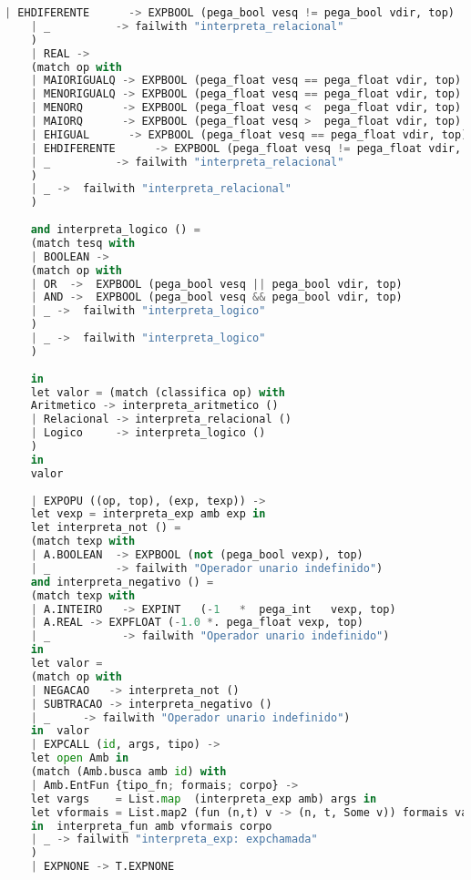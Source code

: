 \documentclass[hidelinks,12pt]{article}
\begin{document}
\begin{appendices}
\begin{lstlisting}[caption=interprete.mll, language=python]
	| EHDIFERENTE      -> EXPBOOL (pega_bool vesq != pega_bool vdir, top)
	| _          -> failwith "interpreta_relacional"
	)
	| REAL ->
	(match op with
	| MAIORIGUALQ -> EXPBOOL (pega_float vesq == pega_float vdir, top)
	| MENORIGUALQ -> EXPBOOL (pega_float vesq == pega_float vdir, top)
	| MENORQ      -> EXPBOOL (pega_float vesq <  pega_float vdir, top)
	| MAIORQ      -> EXPBOOL (pega_float vesq >  pega_float vdir, top)
	| EHIGUAL      -> EXPBOOL (pega_float vesq == pega_float vdir, top)
	| EHDIFERENTE      -> EXPBOOL (pega_float vesq != pega_float vdir, top)
	| _          -> failwith "interpreta_relacional"
	)
	| _ ->  failwith "interpreta_relacional"
	)
	
	and interpreta_logico () =
	(match tesq with
	| BOOLEAN ->
	(match op with
	| OR  ->  EXPBOOL (pega_bool vesq || pega_bool vdir, top)
	| AND ->  EXPBOOL (pega_bool vesq && pega_bool vdir, top)
	| _ ->  failwith "interpreta_logico"
	)
	| _ ->  failwith "interpreta_logico"
	)
	
	in
	let valor = (match (classifica op) with
	Aritmetico -> interpreta_aritmetico ()
	| Relacional -> interpreta_relacional ()
	| Logico     -> interpreta_logico ()
	)
	in
	valor
	
	| EXPOPU ((op, top), (exp, texp)) ->
	let vexp = interpreta_exp amb exp in
	let interpreta_not () = 
	(match texp with
	| A.BOOLEAN  -> EXPBOOL (not (pega_bool vexp), top)
	| _          -> failwith "Operador unario indefinido")
	and interpreta_negativo () = 
	(match texp with
	| A.INTEIRO   -> EXPINT   (-1   *  pega_int   vexp, top)
	| A.REAL -> EXPFLOAT (-1.0 *. pega_float vexp, top)
	| _           -> failwith "Operador unario indefinido")
	in
	let valor =
	(match op with
	| NEGACAO   -> interpreta_not ()
	| SUBTRACAO -> interpreta_negativo ()
	| _     -> failwith "Operador unario indefinido")
	in  valor
	| EXPCALL (id, args, tipo) ->
	let open Amb in
	(match (Amb.busca amb id) with
	| Amb.EntFun {tipo_fn; formais; corpo} ->
	let vargs    = List.map  (interpreta_exp amb) args in
	let vformais = List.map2 (fun (n,t) v -> (n, t, Some v)) formais vargs
	in  interpreta_fun amb vformais corpo
	| _ -> failwith "interpreta_exp: expchamada"
	)
	| EXPNONE -> T.EXPNONE
	

\end{lstlisting}
\end{appendices}
\end{document}
